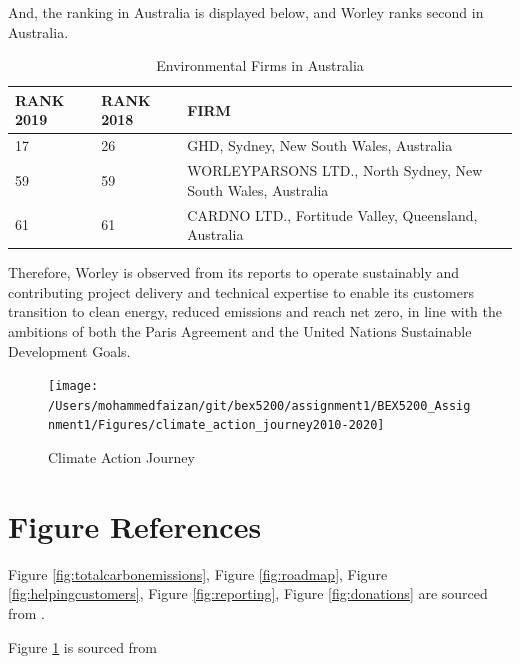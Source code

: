 \documentclass[11pt,a4paper,]{article}
\begin{document}
And, the ranking in Australia is displayed below, and Worley ranks second in Australia.

\begin{table}[!h]

\caption{\label{tab:aus}Environmental Firms in Australia}
\centering
\begin{tabular}[t]{l|l|l}
\hline
RANK 2019 & RANK 2018 & FIRM\\
\hline
17 & 26 & GHD, Sydney, New South Wales, Australia\\
\hline
59 & 59 & WORLEYPARSONS LTD., North Sydney, New South Wales, Australia\\
\hline
61 & 61 & CARDNO LTD., Fortitude Valley, Queensland, Australia\\
\hline
\end{tabular}
\end{table}

Therefore, Worley is observed from its reports to operate sustainably and contributing project delivery and technical expertise to enable its customers transition to clean energy, reduced emissions and reach net zero, in line with the ambitions of both the Paris Agreement and the United Nations Sustainable Development Goals.

\begin{figure}

{\centering \texttt{[image: /Users/mohammedfaizan/git/bex5200/assignment1/BEX5200\_Assignment1/Figures/climate\_action\_journey2010-2020]} 

}

\caption{Climate Action Journey}\label{fig:journey}
\end{figure}

\newpage

\hypertarget{figure-references}{%
\section{Figure References}\label{figure-references}}

Figure \ref{fig:totalcarbonemissions}, Figure \ref{fig:roadmap}, Figure \ref{fig:helpingcustomers}, Figure \ref{fig:reporting}, Figure \ref{fig:donations} are sourced from \textcite{sustainabilityreport2020}.

Figure \ref{fig:journey} is sourced from \textcite{journey}

\printbibliography
\end{document}
